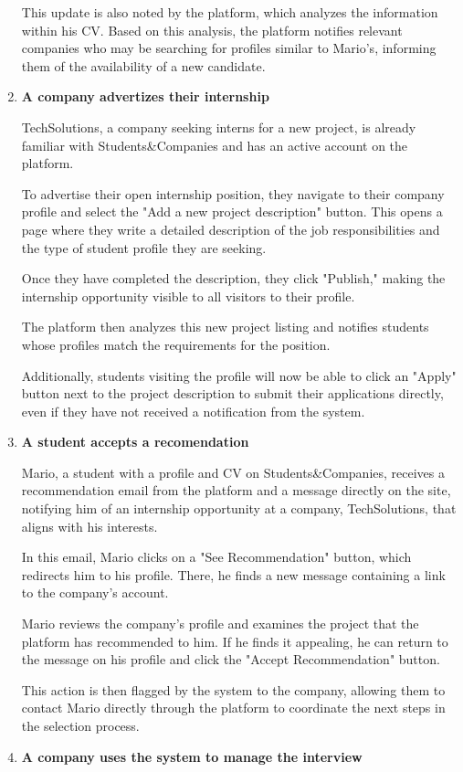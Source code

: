 \begin{enumerate}
    This update is also noted by the platform, which analyzes the information within his CV. Based on this analysis, the platform notifies relevant companies who may be searching for profiles similar to Mario's, informing them of the availability of a new candidate.
    \item \textbf{A company advertizes their internship}
    
    TechSolutions, a company seeking interns for a new project, is already familiar with Students\&Companies and has an active account on the platform.
    
    To advertise their open internship position, they navigate to their company profile and select the "Add a new project description" button. This opens a page where they write a detailed description of the job responsibilities and the type of student profile they are seeking. 
    
    Once they have completed the description, they click "Publish," making the internship opportunity visible to all visitors to their profile.

    The platform then analyzes this new project listing and notifies students whose profiles match the requirements for the position. 
    
    
    Additionally, students visiting the profile will now be able to click an "Apply" button next to the project description to submit their applications directly, even if they have not received a notification from the system.
    \item \textbf{A student accepts a recomendation}

    Mario, a student with a profile and CV on Students\&Companies, receives a recommendation email from the platform and a message directly on the site, notifying him of an internship opportunity at a company, TechSolutions, that aligns with his interests.
   
    In this email, Mario clicks on a "See Recommendation" button, which redirects him to his profile. There, he finds a new message containing a link to the company’s account.

    Mario reviews the company’s profile and examines the project that the platform has recommended to him. If he finds it appealing, he can return to the message on his profile and click the "Accept Recommendation" button.

    This action is then flagged by the system to the company, allowing them to contact Mario directly through the platform to coordinate the next steps in the selection process.
    \item \textbf{A company uses the system to manage the interview}


\end{enumerate}
